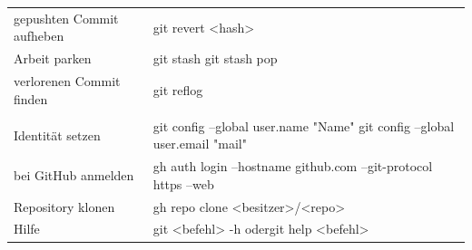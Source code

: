\begin{center}
\begin{tabularx}{\linewidth}{@{}>{\raggedright\arraybackslash}X>{\raggedright\arraybackslash\ttfamily}p{8.0cm}@{}}
  gepushten Commit aufheben           & git revert <hash> \\
  Arbeit parken                       & git stash \newline git stash pop \\
  verlorenen Commit finden            & git reflog \\
  \midrule
  \multicolumn{2}{@{}l}{\textit{Einrichten}} \\
  Identität setzen                    & git config --global user.name "Name" \newline git config --global user.email "mail" \\
  bei GitHub anmelden                 & gh auth login --hostname github.com \newline \hspace*{1em}--git-protocol https --web \\
  Repository klonen                   & gh repo clone <besitzer>/<repo> \\
  Hilfe                               & git <befehl> -h \quad\textrm{oder}\quad git help <befehl> \\
  \bottomrule
\end{tabularx}
\end{center}
